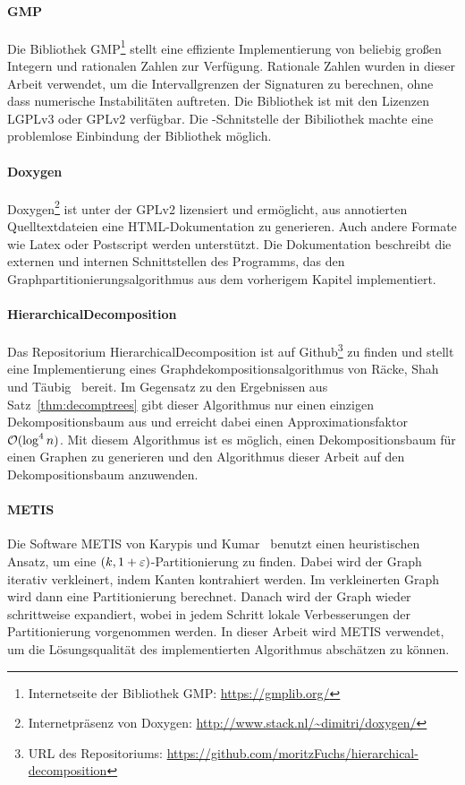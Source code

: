 \paragraph{GMP}
Die Bibliothek GMP\footnote{Internetseite der Bibliothek GMP: \url{https://gmplib.org/}} stellt eine effiziente Implementierung von beliebig großen Integern und rationalen Zahlen zur Verfügung.
Rationale Zahlen wurden in dieser Arbeit verwendet, um die Intervallgrenzen der Signaturen zu berechnen, ohne dass numerische Instabilitäten auftreten. 
Die Bibliothek ist mit den Lizenzen LGPLv3 oder GPLv2 verfügbar.
Die \Cpp\hyp Schnitstelle der Bibiliothek machte eine problemlose Einbindung der Bibliothek möglich.

\paragraph{Doxygen}
Doxygen\footnote{Internetpräsenz von Doxygen: \url{http://www.stack.nl/~dimitri/doxygen/}} ist unter der GPLv2 lizensiert und ermöglicht, aus annotierten Quelltextdateien eine HTML\hyp Dokumentation zu generieren.
Auch andere Formate wie Latex oder Postscript werden unterstützt.
Die Dokumentation beschreibt die externen und internen Schnittstellen des Programms, das den Graphpartitionierungsalgorithmus aus dem vorherigem Kapitel implementiert.

\paragraph{HierarchicalDecomposition}
Das Repositorium HierarchicalDecomposition ist auf Github\footnote{URL des Repositoriums: \url{https://github.com/moritzFuchs/hierarchical-decomposition}} zu finden und stellt eine Implementierung eines Graphdekompositionsalgorithmus von Räcke, Shah und Täubig~\parencite{RST14} bereit.
Im Gegensatz zu den Ergebnissen aus Satz~\ref{thm:decomptrees} gibt dieser Algorithmus nur einen einzigen Dekompositionsbaum aus und erreicht dabei einen Approximationsfaktor $\mathcal{O}(\log^4 n)$.
Mit diesem Algorithmus ist es möglich, einen Dekompositionsbaum für einen Graphen zu generieren und den Algorithmus dieser Arbeit auf den Dekompositionsbaum anzuwenden.

\paragraph{METIS}
Die Software METIS von Karypis und Kumar~\cite{KK98} benutzt einen heuristischen Ansatz, um eine $(k, 1 + \varepsilon)$\hyp Partitionierung zu finden. 
Dabei wird der Graph iterativ verkleinert, indem Kanten kontrahiert werden.
Im verkleinerten Graph wird dann eine Partitionierung berechnet.
Danach wird der Graph wieder schrittweise expandiert, wobei in jedem Schritt lokale Verbesserungen der Partitionierung vorgenommen werden.
In dieser Arbeit wird METIS verwendet, um die Lösungsqualität des implementierten Algorithmus abschätzen zu können.

